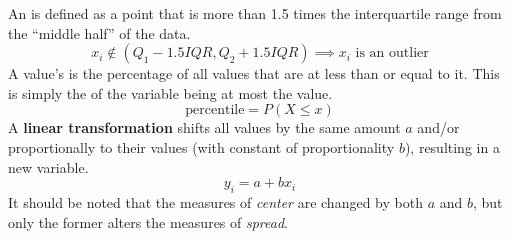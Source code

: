 \documentclass[../AP_Statistics.tex]{subfiles}
\begin{document}
			An  is defined as a point that is more than 1.5 times the interquartile range from the \enquote{middle half} of the data.
			\[x_i\notin (Q_1 - 1.5IQR, Q_2 + 1.5IQR) \implies x_i \text{ is an outlier}\]
			A value's  is the percentage of all values that are at less than or equal to it. This is simply the  of the variable being at most the value.
			\[\mathrm{percentile} = P(X \le x)\]
			A \textbf{linear transformation} shifts all values by the same amount $a$ and/or proportionally to their values (with constant of proportionality $b$), resulting in a new variable.
			\[y_i = a + bx_i\]
			It should be noted that the measures of \emph{center} are changed by both $a$ and $b$, but only the former alters the measures of \emph{spread}. \\
\end{document}
